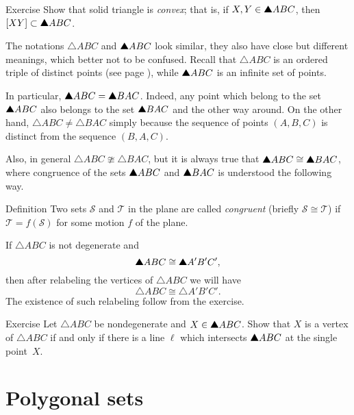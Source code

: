 \begin{thm}{Exercise}\label{ex:triangle-convex}
Show that solid triangle is \emph{convex};
that is, if $X,Y\in\solidtriangle ABC$,
then $[XY]\subset \solidtriangle ABC$.
\end{thm}


The notations $\triangle ABC$ and $\solidtriangle ABC$ look similar,
they also have close but different meanings, 
which better not to be confused.
Recall that $\triangle ABC$ is an ordered triple of distinct points
(see page \pageref{page:def:triangle}),
while $\solidtriangle ABC$ is an infinite set of points.

In particular, $\solidtriangle ABC=\solidtriangle BAC$. 
Indeed, any point which belong to the set $\solidtriangle ABC$ 
also belongs to the set $\solidtriangle BAC$
and the other way around.
On the other hand,
$\triangle ABC\ne\triangle BAC$ simply because the sequence of points $(A,B,C)$ is distinct from the sequence $(B,A,C)$.

Also, in general  $\triangle ABC\ncong\triangle BAC$, but it is always true that $\solidtriangle ABC\cong\solidtriangle BAC$, where congruence of the sets $\solidtriangle ABC$ and $\solidtriangle BAC$ 
is understood the following way.

\begin{thm}{Definition}\label{def:cong-sets}
Two sets $\mathcal{S}$ and $\mathcal{T}$ in the plane  
are called \emph{congruent} 
(briefly $\mathcal{S}\cong \mathcal{T}$)
if 
$\mathcal{T}=f(\mathcal{S})$ for some motion $f$ of the plane.
\end{thm}

If $\triangle ABC$ is not degenerate
and \[\solidtriangle ABC\cong \solidtriangle A'B'C',\]
then after relabeling the vertices of $\triangle ABC$ 
we will have 
\[\triangle ABC\cong \triangle A'B'C'.\]
The existence of such relabeling follow from the exercise.

\begin{thm}{Exercise}\label{ex:vertex}
Let $\triangle ABC$ be nondegenerate and $X\z\in \solidtriangle ABC$.
Show that $X$ is a vertex of $\triangle ABC$
if and only if there is a line $\ell$ which intersects $\solidtriangle ABC$
at the single point~$X$.
\end{thm}

\section*{Polygonal sets}

